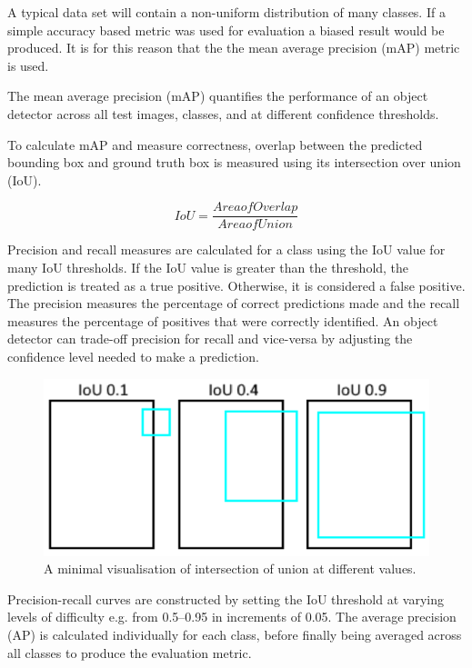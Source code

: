 \documentclass{thesis}
\begin{document}
A typical data set will contain a non-uniform distribution of many classes. If a simple accuracy based metric was used for evaluation a biased result would be produced. It is for this reason that the the mean average precision (mAP) metric is used.

The mean average precision (mAP) quantifies the performance of an object detector across all test images, classes, and at different confidence thresholds.

To calculate mAP and measure correctness, overlap between the predicted bounding box and ground truth box is measured using its intersection over union (IoU). 

\begin{equation}
    IoU = \frac{Area of Overlap}{Area of Union}
\end{equation}

Precision and recall measures are calculated for a class using the IoU value for many IoU thresholds. If the IoU value is greater than the threshold, the prediction is treated as a true positive. Otherwise, it is considered a false positive. The precision measures the percentage of correct predictions made and the recall measures the percentage of positives that were correctly identified. An object detector can trade-off precision for recall and vice-versa by adjusting the confidence level needed to make a prediction.

\begin{figure}[h]
    \centering
    \includegraphics[scale=0.5]{images/iou.png}
    \caption{A minimal visualisation of intersection of union at different values.}
    \label{fig:cnn-diagram}
\end{figure}

Precision-recall curves are constructed by setting the IoU threshold at varying levels of difficulty e.g. from 0.5--0.95 in increments of 0.05. The average precision (AP) is calculated individually for each class, before finally being averaged across all classes to produce the evaluation metric.
\end{document}
